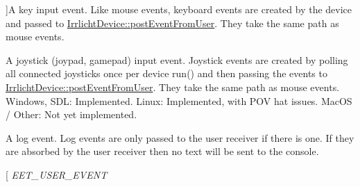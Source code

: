 \begin{Desc}
\begin{description}
{}]A key input event. Like mouse events, keyboard events are created by the device and passed to \hyperlink{classirr_1_1IrrlichtDevice_abf859e39f017b0403c6ed331e48e01df}{Irrlicht\+Device\+::post\+Event\+From\+User}. They take the same path as mouse events. \item[{\em 
E\+E\+T\+\_\+\+J\+O\+Y\+S\+T\+I\+C\+K\+\_\+\+I\+N\+P\+U\+T\+\_\+\+E\+V\+E\+NT\hypertarget{namespaceirr_ac9eed96e06e85ce3c86fcbbbe9e48a0cac81558e4607ad260e96ae0f7b889e9a5}{}\label{namespaceirr_ac9eed96e06e85ce3c86fcbbbe9e48a0cac81558e4607ad260e96ae0f7b889e9a5}
}]A joystick (joypad, gamepad) input event. Joystick events are created by polling all connected joysticks once per device run() and then passing the events to \hyperlink{classirr_1_1IrrlichtDevice_abf859e39f017b0403c6ed331e48e01df}{Irrlicht\+Device\+::post\+Event\+From\+User}. They take the same path as mouse events. Windows, S\+DL\+: Implemented. Linux\+: Implemented, with P\+OV hat issues. Mac\+OS / Other\+: Not yet implemented. \item[{\em 
E\+E\+T\+\_\+\+L\+O\+G\+\_\+\+T\+E\+X\+T\+\_\+\+E\+V\+E\+NT\hypertarget{namespaceirr_ac9eed96e06e85ce3c86fcbbbe9e48a0ca8553b889c8da285c96b90116ae019952}{}\label{namespaceirr_ac9eed96e06e85ce3c86fcbbbe9e48a0ca8553b889c8da285c96b90116ae019952}
}]A log event. Log events are only passed to the user receiver if there is one. If they are absorbed by the user receiver then no text will be sent to the console. \item[{\em 
E\+E\+T\+\_\+\+U\+S\+E\+R\+\_\+\+E\+V\+E\+NT\hypertarget{namespaceirr_ac9eed96e06e85ce3c86fcbbbe9e48a0ca4cc15ca95969a8b5d150c3d952ad06e4}{}\label{namespaceirr_ac9eed96e06e85ce3c86fcbbbe9e48a0ca4cc15ca95969a8b5d150c3d952ad06e4}
}
\end{description}
\end{Desc}
